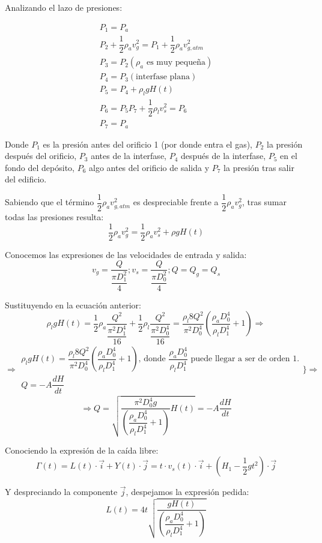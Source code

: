\begin{enumerate}
Analizando el lazo de presiones:

\[
	\begin{matrix}
		P_1 = P_a\\
		P_2 + \dfrac{1}{2}\rho_a v_g^2 = P_1 + \dfrac{1}{2}\rho_a v_{g,atm}^2\\
		P_3 = P_2(\rho_a \text{ es muy pequeña})\\
		P_4 = P_3 (\text{interfase plana})\\
		P_5 = P_4 + \rho_l g H(t)\\
		P_6 = P_5
		P_7 + \dfrac{1}{2} \rho_l v_s^2 = P_6\\
		P_7 = P_a
	\end{matrix}
\]

Donde $P_1$ es la presión antes del orificio 1 (por donde entra el gas), $P_2$ la presión después del orificio, $P_3$ antes de la interfase, $P_4$ después de la interfase, $P_5$ en el fondo del depósito, $P_6$ algo antes del orificio de salida y $P_7$ la presión tras salir del edificio.


Sabiendo que el término $\dfrac{1}{2}\rho_a v_{g,atm}^2$ es despreciable frente a $\dfrac{1}{2}\rho_a v_{g}^2$, tras sumar todas las presiones resulta:
\[\dfrac{1}{2}\rho_a v_{g}^2 = \dfrac{1}{2}\rho_a v_{s}^2 + \rho g H(t)\]

Conocemos las expresiones de las velocidades de entrada y salida:
\[v_g = \dfrac{Q}{\dfrac{\pi D_1^2}{4}}; v_s = \dfrac{Q}{\dfrac{\pi D_0^2}{4}}; Q = Q_g = Q_s\]

Sustituyendo en la ecuación anterior:
\[\rho_l g H(t) = \dfrac{1}{2} \rho_a \dfrac{Q^2}{\dfrac{\pi^2 D_1^4}{16}} + \dfrac{1}{2}\rho_l \dfrac{Q^2}{\dfrac{\pi^2 D_0^4}{16}} =
\dfrac{\rho_l 8 Q^2}{\pi^2 D_0^4}\left(\dfrac{\rho_a D_0^4}{\rho_l D_1^4} + 1\right) \Rightarrow\]
\[\Rightarrow
	\begin{matrix}
		\rho_l g H(t)=\dfrac{\rho_l 8 Q^2}{\pi^2 D_0^4}\left(\dfrac{\rho_a D_0^4}{\rho_l D_1^4} + 1\right)\text{, donde }\dfrac{\rho_a D_0^4}{\rho_l D_1^4}\text{ puede llegar a ser de orden 1.}\\
		Q=-A\dfrac{dH}{dt}
	\end{matrix}
	\Biggr\} \Rightarrow\]
\[\Rightarrow Q = \sqrt{\dfrac{\pi^2 D_0^4 g}{\left(\dfrac{\rho_a D_0^4}{\rho_l D_1^4} + 1\right)} H(t)} = -A\dfrac{dH}{dt}\]

Conociendo la expresión de la caída libre:
\[\Gamma(t) = L(t)\cdot\vec{i} + Y(t)\cdot\vec{j} = t\cdot v_s(t) \cdot\vec{i} + (H_1 -\dfrac{1}{2}gt^2 )\cdot\vec{j}\]

Y despreciando la componente $\vec{j}$, despejamos la expresión pedida:
\[L(t) = 4t
\sqrt
{
	\dfrac
	{gH(t)}
	{
		\left(
		\dfrac
			{\rho_a D_0^4}
			{\rho_l D_1^4}
	 	+ 1
		\right)
	}
}
\]


\end{enumerate}
